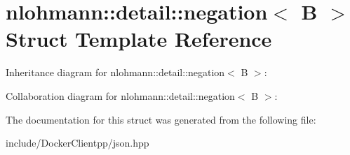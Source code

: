 \hypertarget{structnlohmann_1_1detail_1_1negation}{}\section{nlohmann\+::detail\+::negation$<$ B $>$ Struct Template Reference}
\label{structnlohmann_1_1detail_1_1negation}


Inheritance diagram for nlohmann\+::detail\+::negation$<$ B $>$\+:


Collaboration diagram for nlohmann\+::detail\+::negation$<$ B $>$\+:


The documentation for this struct was generated from the following file\+:\begin{DoxyCompactItemize}
\item 
include/\+Docker\+Clientpp/json.\+hpp\end{DoxyCompactItemize}
